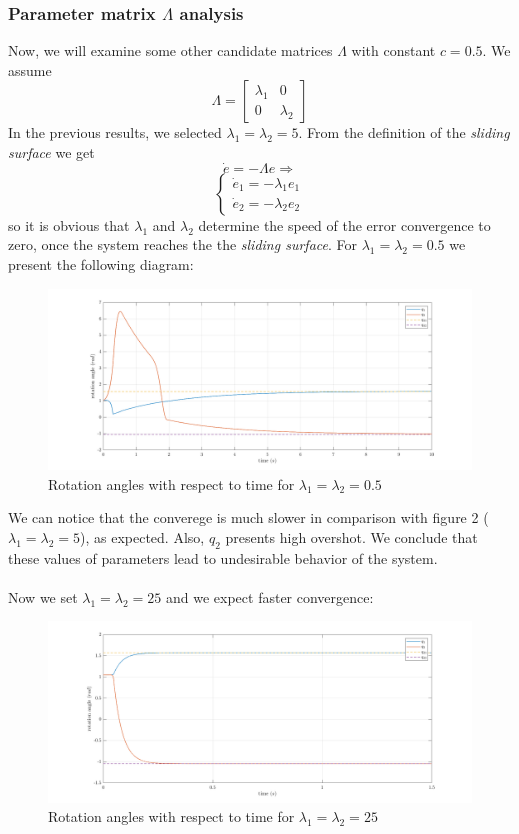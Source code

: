 \documentclass[a4paper]{article}
\begin{document}
\subsubsection{Parameter matrix $\Lambda$ analysis}
Now, we will examine some other candidate matrices $\Lambda$ with constant $c=0.5$. We assume 
$$
    \Lambda =   \begin{bmatrix}
                    \lambda_1 & 0 \\
                    0 & \lambda_2
                \end{bmatrix}
$$
In the previous results, we selected $\lambda_1 = \lambda_2 = 5$. From the definition of the \textit{sliding surface} we get 
$$
    \dot{e} = - \Lambda e \Rightarrow
$$
$$
    \begin{cases} \dot{e}_1 = - \lambda_1 e_1 \\ \dot{e}_2 = - \lambda_2 e_2 \end{cases}
$$
so it is obvious that $\lambda_1$ and $\lambda_2$ determine the speed of the error convergence to zero, 
once the system reaches the the \textit{sliding surface}. For $\lambda_1 = \lambda_2 = 0.5$ we present the following diagram:
\begin{figure}[H]
    \centering
    \includegraphics[width=15cm]{fig/sim1/q05.png}
    \caption{Rotation angles with respect to time for $\lambda_1 = \lambda_2 = 0.5$}
\end{figure}

\noindent\hspace{-2pt}
We can notice that the converege is much slower in comparison with figure 2 ($\lambda_1 = \lambda_2 = 5$), as expected. Also, $q_2$ presents 
high overshot. We conclude that these values of parameters lead to undesirable behavior of the system. \\\\
Now we set $\lambda_1 = \lambda_2 = 25$ and we expect faster convergence:
\begin{figure}[H]
    \centering
    \includegraphics[width=15cm]{fig/sim1/q25.png}
    \caption{Rotation angles with respect to time for $\lambda_1 = \lambda_2 = 25$}
\end{figure}
\end{document}
